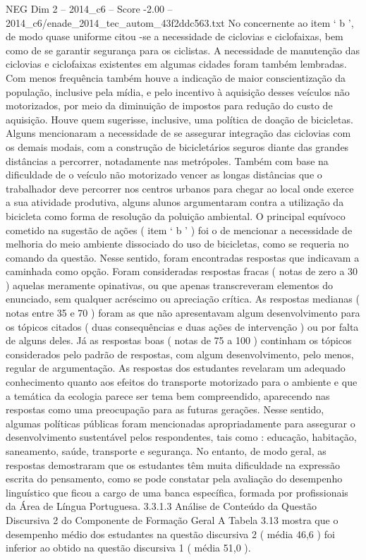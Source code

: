 \begin{textsample}{NEG Dim 2 – 2014\_c6 – Score -2.00 – 2014\_c6/enade\_2014\_tec\_autom\_43f2ddc563.txt}
No concernente ao item ‘ b ’, de modo quase uniforme citou -se a necessidade de ciclovias e ciclofaixas, bem como de se garantir segurança para os ciclistas.
A necessidade de manutenção das ciclovias e ciclofaixas existentes em algumas cidades foram também lembradas.
Com menos frequência também houve a indicação de maior conscientização da população, inclusive pela mídia, e pelo incentivo à aquisição desses veículos não motorizados, por meio da diminuição de impostos para redução do custo de aquisição.
Houve quem sugerisse, inclusive, uma política de doação de bicicletas.
Alguns mencionaram a necessidade de se assegurar integração das ciclovias com os demais modais, com a construção de bicicletários seguros diante das grandes distâncias a percorrer, notadamente nas metrópoles.
Também com base na dificuldade de o veículo não motorizado vencer as longas distâncias que o trabalhador deve percorrer nos centros urbanos para chegar ao local onde exerce a sua atividade produtiva, alguns alunos argumentaram contra a utilização da bicicleta como forma de resolução da poluição ambiental.
O principal equívoco cometido na sugestão de ações ( item ‘ b ’ ) foi o de mencionar a necessidade de melhoria do meio ambiente dissociado do uso de bicicletas, como se requeria no comando da questão.
Nesse sentido, foram encontradas respostas que indicavam a caminhada como opção.
Foram consideradas respostas fracas ( notas de zero a 30 ) aquelas meramente opinativas, ou que apenas transcreveram elementos do enunciado, sem qualquer acréscimo ou apreciação crítica.
As respostas medianas ( notas entre 35 e 70 ) foram as que não apresentavam algum desenvolvimento para os tópicos citados ( duas consequências e duas ações de intervenção ) ou por falta de alguns deles.
Já as respostas boas ( notas de 75 a 100 ) continham os tópicos considerados pelo padrão de respostas, com algum desenvolvimento, pelo menos, regular de argumentação.
As respostas dos estudantes revelaram um adequado conhecimento quanto aos efeitos do transporte motorizado para o ambiente e que a temática da ecologia parece ser tema bem compreendido, aparecendo nas respostas como uma preocupação para as futuras gerações.
Nesse sentido, algumas políticas públicas foram mencionadas apropriadamente para assegurar o desenvolvimento sustentável pelos respondentes, tais como : educação, habitação, saneamento, saúde, transporte e segurança.
No entanto, de modo geral, as respostas demostraram que os estudantes têm muita dificuldade na expressão escrita do pensamento, como se pode constatar pela avaliação do desempenho linguístico que ficou a cargo de uma banca específica, formada por profissionais da Área de Língua Portuguesa. 3.3.1.3 Análise de Conteúdo da Questão Discursiva 2 do Componente de Formação Geral A Tabela 3.13 mostra que o desempenho médio dos estudantes na questão discursiva 2 ( média 46,6 ) foi inferior ao obtido na questão discursiva 1 ( média 51,0 ).

\end{textsample}
